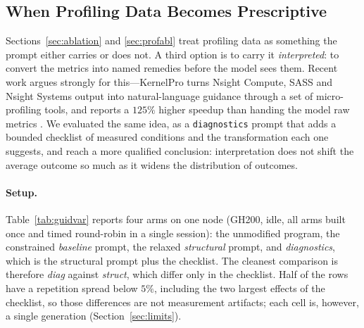 \subsection{When Profiling Data Becomes Prescriptive}
\label{sec:guidvar}
Sections~\ref{sec:ablation} and \ref{sec:profabl} treat profiling data as something the prompt either
carries or does not. A third option is to carry it \emph{interpreted}: to convert the metrics into
named remedies before the model sees them. Recent work argues strongly for this---KernelPro turns
Nsight Compute, SASS and Nsight Systems output into natural-language guidance through a set of
micro-profiling tools, and reports a $125\%$ higher speedup than handing the model raw metrics
\cite{gai2026kernelpro}. We evaluated the same idea, as a \texttt{diagnostics} prompt that adds a
bounded checklist of measured conditions and the transformation each one suggests, and reach a more
qualified conclusion: interpretation does not shift the average outcome so much as it widens the
distribution of outcomes.

\paragraph{Setup.}
Table~\ref{tab:guidvar} reports four arms on one node (GH200, idle, all arms built once and timed
round-robin in a single session): the unmodified program, the constrained \emph{baseline} prompt, the
relaxed \emph{structural} prompt, and \emph{diagnostics}, which is the structural prompt plus the
checklist. The cleanest comparison is therefore \emph{diag} against \emph{struct}, which differ only
in the checklist. Half of the rows have a repetition spread below $5\%$, including the two largest
effects of the checklist, so those differences are not measurement artifacts; each cell is, however,
a single generation (Section~\ref{sec:limits}).

